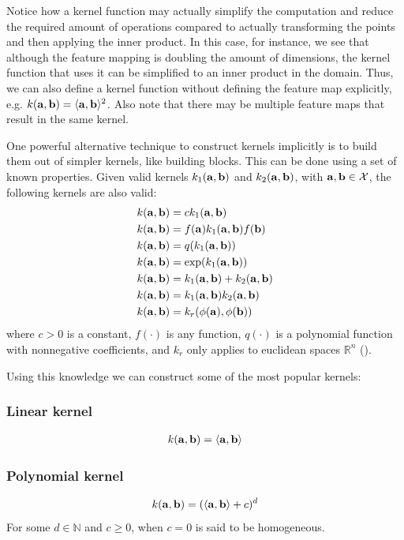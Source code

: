Notice how a kernel function may actually simplify the computation and reduce the required amount of operations compared to actually transforming the points and then applying the inner product. In this case, for in\-stance, we see that although the feature mapping is doubling the amount of di\-men\-sions, the kernel function that uses it can be simplified to an inner product in the domain. Thus, we can also define a kernel function without defining the feature map explicitly, e.g. $k(\mathbf{a}, \mathbf{b}) = \langle\mathbf{a}, \mathbf{b}\rangle^2$. Also note that there may be multiple feature maps that result in the same kernel. 

One powerful alternative technique to construct kernels implicitly is to build them out of simpler kernels, like building blocks. This can be done using a set of known properties. Given valid kernels $k_1(\mathbf{a}, \mathbf{b})$ and $k_2(\mathbf{a}, \mathbf{b})$, with $\mathbf{a}, \mathbf{b} \in \mathcal{X}$, the following kernels are also valid:
\begin{align}
    k(\mathbf{a}, \mathbf{b}) &= c k_1(\mathbf{a}, \mathbf{b})\\
    k(\mathbf{a}, \mathbf{b}) &= f(\mathbf{a}) k_1(\mathbf{a}, \mathbf{b}) f(\mathbf{b})\\
    k(\mathbf{a}, \mathbf{b}) &= q(k_1(\mathbf{a}, \mathbf{b}))\\
    k(\mathbf{a}, \mathbf{b}) &= \text{exp}(k_1(\mathbf{a}, \mathbf{b}))\\
    k(\mathbf{a}, \mathbf{b}) &= k_1(\mathbf{a}, \mathbf{b}) + k_2(\mathbf{a}, \mathbf{b})\\
    k(\mathbf{a}, \mathbf{b}) &= k_1(\mathbf{a}, \mathbf{b}) k_2(\mathbf{a}, \mathbf{b})\\
    k(\mathbf{a}, \mathbf{b}) &= k_{r}(\phi(\mathbf{a}), \phi(\mathbf{b}))
\end{align} 
where $c > 0$ is a constant, $f(\cdot)$ is any function, $q(\cdot)$ is a polynomial function with nonnegative coefficients, and $k_r$ only applies to euclidean spaces $\mathbb{R}^n$ (\cite{bishop_pattern_2006}).

Using this knowledge we can construct some of the most popular kernels:

\subsubsection*{Linear kernel}
\begin{align}
    k(\mathbf{a}, \mathbf{b}) = \langle\mathbf{a}, \mathbf{b}\rangle
\end{align}

\subsubsection*{Polynomial kernel}
\begin{align}
    k(\mathbf{a}, \mathbf{b}) = (\langle\mathbf{a}, \mathbf{b}\rangle + c)^d
\end{align}
For some $d \in \mathbb{N}$ and $c \ge 0$, when $c = 0$ is said to be homogeneous.

